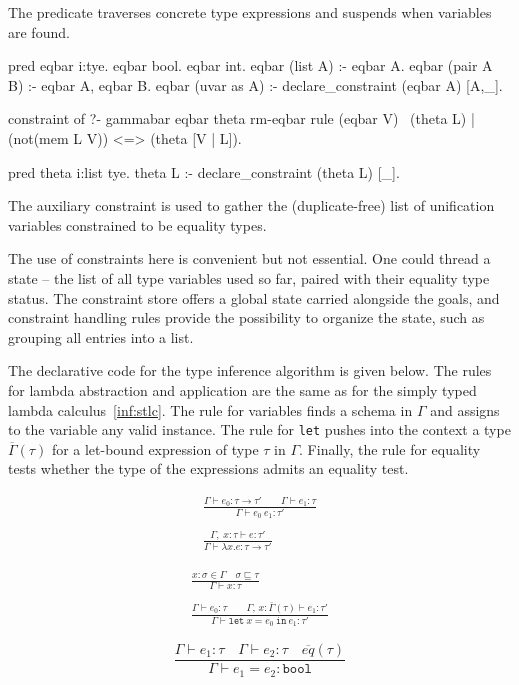 \documentclass[a4paper, 11pt]{book}
\begin{document}
The  predicate traverses concrete type expressions and suspends
when variables are found.

\begin{elpicode}
pred eqbar i:tye.
eqbar bool.
eqbar int.
eqbar (list A) :- eqbar A.
eqbar (pair A B) :- eqbar A, eqbar B.
eqbar (uvar as A) :- declare_constraint (eqbar A) [A,_].

constraint of ?- gammabar eqbar theta rm-eqbar {
  rule (eqbar V) \ (theta L) | (not(mem L V)) <=> (theta [V | L]).
}

pred theta i:list tye.
theta L :- declare_constraint (theta L) [_].
\end{elpicode}

The auxiliary constraint  is used to gather the (duplicate-free)
list of unification variables constrained to be equality types.

The use of constraints here is convenient but not essential. One could thread
a state -- the list of all type variables used so far, paired with their
equality type status. The constraint store offers a global state carried
alongside the goals, and constraint handling rules provide the possibility to
organize the state, such as grouping all entries into a list.

The declarative code for the type inference algorithm is given below. The
rules for lambda abstraction and application are the same as for the simply
typed lambda calculus~\cref{inf:stlc}. The rule for variables finds a schema
in $\Gamma$ and assigns to the variable any valid instance. The rule for
\texttt{let} pushes into the context a type $\overline{\Gamma}(\tau)$ for a
let-bound expression of type $\tau$ in $\Gamma$. Finally, the rule for
equality tests whether the type of the expressions admits an equality test.

\begin{center}
\begin{minipage}{0.45\textwidth}
$$
\begin{array}{cl}
  \displaystyle\frac{\Gamma \vdash e_0:\tau \rightarrow \tau' \quad\quad \Gamma \vdash e_1 : \tau }{\Gamma \vdash e_0\ e_1 : \tau'}\\ \\
  \displaystyle\frac{\Gamma,\;x:\tau\vdash e:\tau'}{\Gamma \vdash \lambda x.e : \tau \rightarrow \tau'}
\end{array}
  $$
\end{minipage}
\begin{minipage}{0.45\textwidth}
$$
\begin{array}{cl}
  \displaystyle\frac{x:\sigma \in \Gamma \quad \sigma \sqsubseteq \tau}{\Gamma \vdash x:\tau}\\ \\
  \displaystyle\frac{\Gamma \vdash e_0:\tau \quad\quad \Gamma,\,x:\bar{\Gamma}(\tau) \vdash e_1:\tau'}{\Gamma \vdash \mathtt{let}\ x = e_0\ \mathtt{in}\ e_1 :  \tau'}
  \end{array}
$$
\end{minipage}
$$ 
\displaystyle\frac{\Gamma \vdash e_1 : \tau \quad \Gamma \vdash e_2 : \tau \quad \overline{eq}(\tau)}{\Gamma \vdash e_1 = e_2: \mathtt{bool}}
$$
\end{center}
\end{document}
